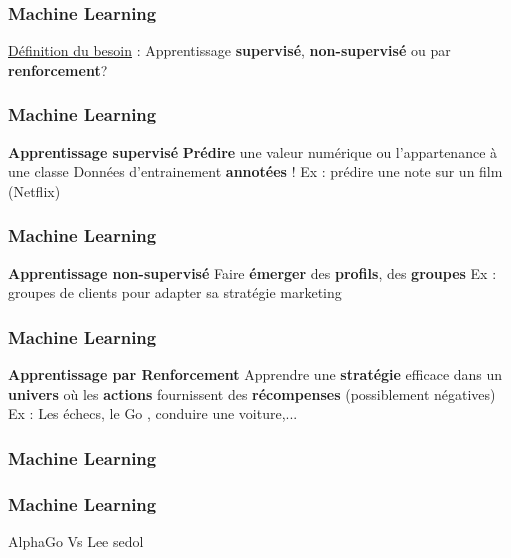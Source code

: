 \documentclass{formation}
\begin{document}
\begin{frame}
  \frametitle{Machine Learning}
  \underline{Définition du besoin} :
  \newline
  \newline
  Apprentissage \textbf{supervisé}, \textbf{non-supervisé} ou par \textbf{renforcement}?
\end{frame}

\begin{frame}
  \frametitle{Machine Learning}
  \textbf{Apprentissage supervisé}
  \newline \newline
  \textbf{Prédire} une valeur numérique ou l'appartenance à une classe
  \newline
  Données d'entrainement \textbf{annotées} !
  \newline
  Ex : prédire une note sur un film (Netflix)
\end{frame}

\begin{frame}
  \frametitle{Machine Learning}
  \textbf{Apprentissage non-supervisé}
  \newline \newline
  Faire \textbf{émerger} des \textbf{profils}, des \textbf{groupes}
  \newline
  Ex : groupes de clients pour adapter sa stratégie marketing
\end{frame}

\begin{frame}
  \frametitle{Machine Learning}
  \textbf{Apprentissage par Renforcement}
  \newline \newline
  Apprendre une \textbf{stratégie} efficace dans un \textbf{univers} où les \textbf{actions} fournissent des \textbf{récompenses} (possiblement négatives)
  \newline
  Ex : Les échecs, le Go , conduire une voiture,...
\end{frame}

\begin{frame}
  \frametitle{Machine Learning}
\end{frame}

\begin{frame}
  \frametitle{Machine Learning}
  AlphaGo Vs Lee sedol
\end{frame}
\end{document}
